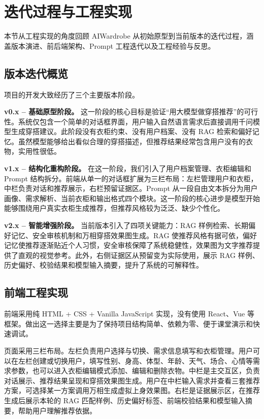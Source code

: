 \documentclass{applemlr}
\begin{document}
\section{迭代过程与工程实现}
\label{sec:engineering}

本节从工程实现的角度回顾 AIWardrobe 从初始原型到当前版本的迭代过程，涵盖版本演进、前后端架构、Prompt 工程迭代以及工程经验与反思。

\subsection{版本迭代概览}

项目的开发大致经历了三个主要版本阶段。

\textbf{v0.x -- 基础原型阶段。} 这一阶段的核心目标是验证``用大模型做穿搭推荐''的可行性。系统仅包含一个简单的对话框界面，用户输入自然语言需求后直接调用千问模型生成穿搭建议。此阶段没有衣柜约束、没有用户档案、没有 RAG 检索和偏好记忆。虽然模型能够给出看似合理的穿搭描述，但推荐结果经常包含用户没有的衣物，实用性很低。

\textbf{v1.x -- 结构化重构阶段。} 在这一阶段，我们引入了用户档案管理、衣柜编辑和 Prompt 结构拆分。前端从单一的对话框扩展为三栏布局：左栏管理用户和衣柜，中栏负责对话和推荐展示，右栏预留证据区。Prompt 从一段自由文本拆分为用户画像、需求解析、当前衣柜和输出格式四个模块。这一阶段的核心进步是模型开始能够围绕用户真实衣柜生成推荐，但推荐风格较为泛泛、缺少个性化。

\textbf{v2.x -- 智能增强阶段。} 当前版本引入了四项关键能力：RAG 样例检索、长期偏好记忆、安全审核机制和万相穿搭效果图生成。RAG 使推荐风格有据可依，偏好记忆使推荐逐渐贴近个人习惯，安全审核保障了系统稳健性，效果图为文字推荐提供了直观的视觉参考。此外，右侧证据区从预留变为实际使用，展示 RAG 样例、历史偏好、校验结果和模型输入摘要，提升了系统的可解释性。

\subsection{前端工程实现}

前端采用纯 HTML + CSS + Vanilla JavaScript 实现，没有使用 React、Vue 等框架。做出这一选择主要是为了保持项目结构简单、依赖为零、便于课堂演示和快速调试。

页面采用三栏布局。左栏负责用户选择与切换、需求信息填写和衣柜管理。用户可以在左栏创建或切换用户，填写性别、身高、体型、年龄、天气、场合、心情等需求参数，也可以进入衣柜编辑模式添加、编辑和删除衣物。中栏是主交互区，负责对话展示、推荐结果呈现和穿搭效果图生成。用户在中栏输入需求并查看三套推荐方案，可选择某一方案调用万相生成虚拟上身效果图。右栏是证据展示区，在推荐生成后展示本轮的 RAG 匹配样例、历史偏好标签、前端校验结果和模型输入摘要，帮助用户理解推荐依据。
\end{document}
